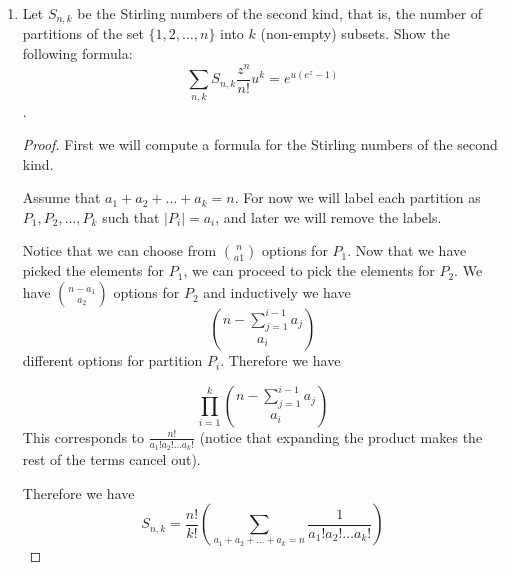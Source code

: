 \documentclass[12pt]{article}
\begin{document}
\begin{enumerate}
\begin{proof}
    This yields $$ \hat A(z) = \displaystyle \sum \limits_{n \geq 2} 2nz^n / (z-1) ^2$$
    
    It follows that $$ \hat A(z) = 2 (\frac{z}{1-z})' (1-z)^{-2}$$
    
    This implies that $\hat A(z) = 2z (1-z)^{-4} = 2z (z-1) ^ {-4}$. Applying the negative binomial theorem yields $\hat A(z) = 2z \displaystyle \sum \limits_{n\geq 1} {4+n-1 \choose n}z ^n (-1^n)  (-1^{-n})$
    Therefore $\hat A(z) = \displaystyle \sum \limits_{n \geq2} 2 {n+2 \choose n-1} z^{n} = \displaystyle \sum \limits_{n \geq2} 2 {n+2 \choose 3} z^{n}  = \displaystyle \sum \limits_{n \geq2} \frac{(n+2) (n+1) (n-1)}{3}  z^{n}$.
    
    Since $\hat A(z)$ is an EGF, then $a_n = \begin{cases} 1 \quad \textrm{ if } n = 0,1 \\ \displaystyle\frac{(n-1)(n+2)!}{3} \quad \textrm{otherwise}\end{cases}$
    

\end{proof}
    \item Let $S_{n,k}$ be the Stirling numbers of the second kind, that is, the number of partitions of the set $\{1,2, \dots, n\}$ into $k$ (non-empty) subsets. Show the following formula:
    $$ \sum \limits_{n,k} S_{n,k} \frac{z^n}{n!}u^k = e^{u(e^z-1)}$$.
    
    \begin{proof}
        First we will compute a formula for the Stirling numbers of the second kind.
        
        Assume that $a_1 + a_2 + \ldots + a_k = n$. For now we will label each partition as $P_1, P_2, \ldots, P_k$ such that $\vert P_i \vert = a_i$, and later we will remove the labels.
        
        Notice that we can choose from ${n \choose a1}$ options for $P_1$. Now that we have picked the elements for $P_1$, we can proceed to pick the elements for $P_2$. We have ${n-a_1 \choose a_2}$ options for $P_2$ and inductively we have $$\displaystyle {n-\sum \limits_{j=1}^{i-1} a_j \choose a_i}$$
        different options for partition $P_i$. Therefore we have 
        
        $$ \prod\limits_{i=1}^{k} \displaystyle{n-\sum \limits_{j=1}^{i-1} a_j \choose a_i}$$ This corresponds to $ \displaystyle\frac{n!}{a_1! a_2! \ldots a_k!}$ (notice that expanding the product makes the rest of the terms cancel out).
        
        Therefore we have 
        \begin{equation}
          S_{n,k}=\frac{n!}{k!}(\displaystyle\sum \limits_{a_1+a_2+\ldots + a_k = n } \frac{1}{a_1! a_2! \ldots a_k!}) 
        \end{equation}
        

\end{proof}
\end{enumerate}
\end{document}
